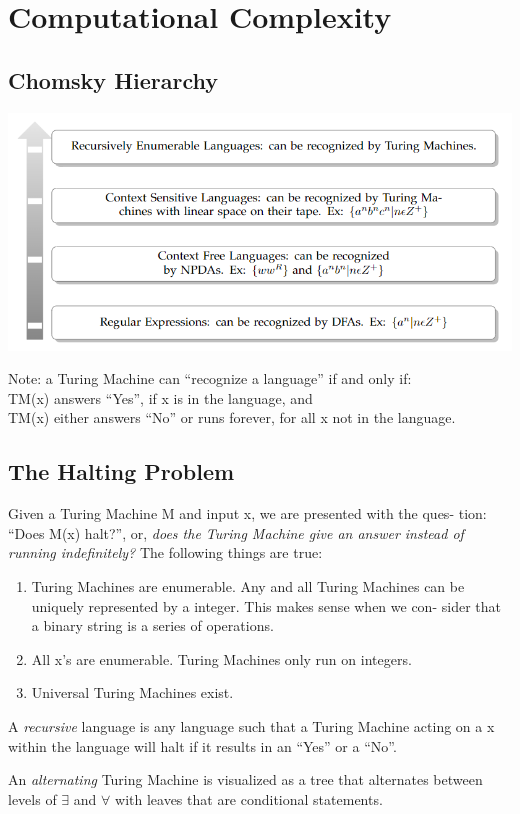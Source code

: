 \section{Computational Complexity}

\subsection{Chomsky Hierarchy}
\begin{center}
    \includegraphics[scale=0.8]{figures/Chomsky_Hierarchy.png}
\end{center}
Note: a Turing Machine can ``recognize a language'' if and only if: \\
\quad TM(x) answers ``Yes'', if x is in the language, and \\
\quad TM(x) either answers ``No'' or runs forever, for all x not in the language.

\subsection{The Halting Problem}
Given a Turing Machine M and input x, we are presented with the ques-
tion: ``Does M(x) halt?'', or, \emph{does the Turing Machine give an answer instead of
running indeﬁnitely?} The following things are true:
\begin{enumerate}
    \item Turing Machines are enumerable. Any and all Turing Machines can
    be uniquely represented by a integer. This makes sense when we con-
    sider that a binary string is a series of operations.
    \item All x's are enumerable. Turing Machines only run on integers.
    \item Universal Turing Machines exist.
\end{enumerate}

\begin{definition}
    A \emph{recursive} language is any language such that a Turing Machine
    acting on a x within the language will halt if it results in an ``Yes'' or a ``No''.
\end{definition}
\begin{definition}
    An \emph{alternating} Turing Machine is visualized as a tree that alternates 
    between levels of $\exists$ and $\forall$ with leaves that are conditional statements.
\end{definition}

